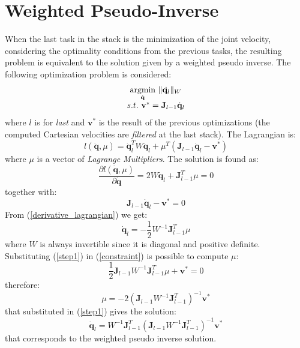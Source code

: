 \section{Weighted Pseudo-Inverse}
\label{app:weighted-pseudo-inverse}

When the last task in the stack is the minimization of the joint velocity, considering the optimality conditions from the previous tasks, the resulting problem is equivalent to the solution given by a weighted pseudo inverse. 
The following optimization problem is considered:
\begin{equation} 
\label{weighted_pseudoinverse}
\begin{array}{c}
\underset{\dot{\mathbf{q}}}{\operatorname{argmin}} \ \Arrowvert \dot{\mathbf{q}_l} \Arrowvert_W \\
s.t. \ \mathbf{v}^* = \mathbf{J}_{l-1}\dot{\mathbf{q}}_l\\
\end{array}
\end{equation}
where $l$ is for \emph{last} and $\mathbf{v}^*$ is the result of the previous optimizations (the computed Cartesian velocities are \emph{filtered} at the last stack). The Lagrangian is:
\begin{equation}
l(\dot{\mathbf{q}}, \mu) = \dot{\mathbf{q}}_l^TW\dot{\mathbf{q}}_l + \mu^T(\mathbf{J}_{l-1}\dot{\mathbf{q}}_l - \mathbf{v}^*)
\end{equation}
where $\mu$ is a vector of \emph{Lagrange Multipliers}. The solution is found as:
\begin{equation}
\label{derivative_lagrangian}
\frac{\partial l(\dot{\mathbf{q}}, \mu)}{\partial\dot{\mathbf{q}}} = 2W\dot{\mathbf{q}}_l+\mathbf{J}_{l-1}^T\mu = 0
\end{equation}
together with:
\begin{equation}
\label{constraint}
\mathbf{J}_{l-1}\dot{\mathbf{q}}_l-\mathbf{v}^* = 0
\end{equation}
From (\ref{derivative_lagrangian}) we get:
\begin{equation}
\label{step1}
\dot{\mathbf{q}}_l = -\frac{1}{2}W^{-1}\mathbf{J}_{l-1}^T\mu 
\end{equation}
where $W$ is always invertible since it is diagonal and positive definite. Substituting (\ref{step1}) in (\ref{constraint}) is possible to compute $\mu$:
\begin{equation}
\label{lambda_step1}
\frac{1}{2}\mathbf{J}_{l-1}W^{-1}\mathbf{J}_{l-1}^T\mu + \mathbf{v}^* = 0
\end{equation}
therefore:
\begin{equation}
\label{lambda_step2}
\mu = -2(\mathbf{J}_{l-1}W^{-1}\mathbf{J}_{l-1}^T)^{-1}\mathbf{v}^*
\end{equation}
that substituted in (\ref{step1}) gives the solution:
\begin{equation}
\label{solution}
\dot{\mathbf{q}}_l = W^{-1}\mathbf{J}_{l-1}^T(\mathbf{J}_{l-1}W^{-1}\mathbf{J}_{l-1}^T)^{-1}\mathbf{v}^*
\end{equation}
that corresponds to the weighted pseudo inverse solution.

